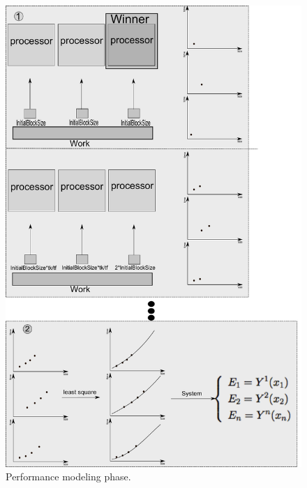 \documentclass[journal]{IEEEtran}
\begin{document}
\begin{figure}[!t]
	\centering
	\includegraphics[scale=0.25]{NovaFigura_Algoritmo.pdf} 
	\caption{Performance modeling phase.}
	\label{fig: algoritmo}
\end{figure}

\end{document}
